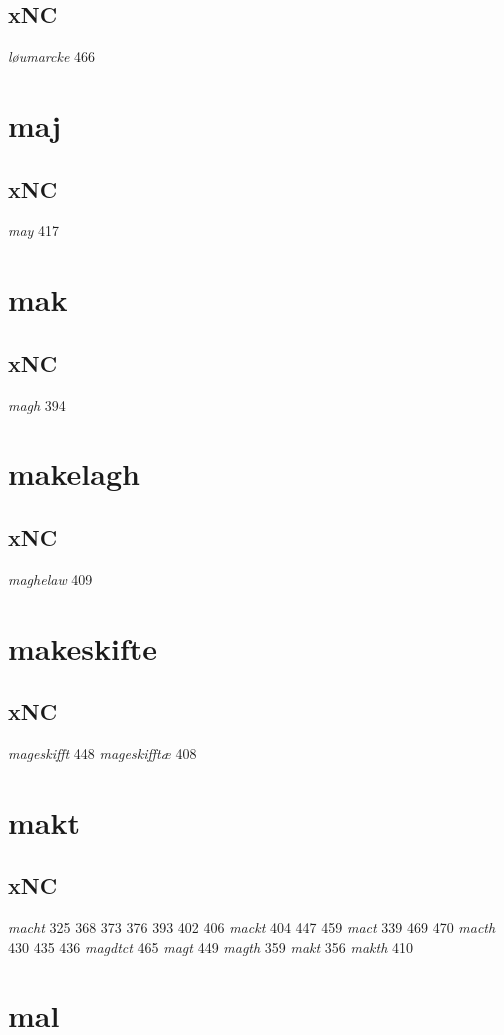 \documentclass[a4paper,twocolumn]{article}
\begin{document}
\subsection{xNC}
\label{sec:org1006d99}
\emph{løumarcke} 466 
\section{maj}
\label{sec:orge28d9ab}
\subsection{xNC}
\label{sec:org87bcf81}
\emph{may} 417 
\section{mak}
\label{sec:org011617b}
\subsection{xNC}
\label{sec:orgd7c3bf0}
\emph{magh} 394 
\section{makelagh}
\label{sec:org3b723a3}
\subsection{xNC}
\label{sec:org15263b2}
\emph{maghelaw} 409 
\section{makeskifte}
\label{sec:org078026a}
\subsection{xNC}
\label{sec:orgc7aa3cc}
\emph{mageskifft} 448 \emph{mageskifftæ} 408 
\section{makt}
\label{sec:orgf4ffd5f}
\subsection{xNC}
\label{sec:org0481ea8}
\emph{macht} 325 368 373 376 393 402 406 \emph{mackt} 404 447 459 \emph{mact} 339 469 470 \emph{macth} 430 435 436 \emph{magdtct} 465 \emph{magt} 449 \emph{magth} 359 \emph{makt} 356 \emph{makth} 410 
\section{mal}
\label{sec:org2c7de65}
\end{document}
